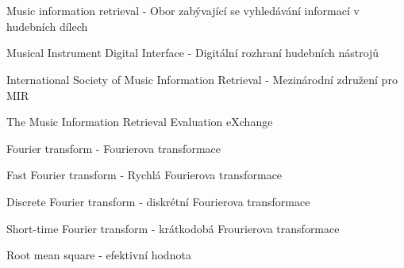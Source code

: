 \cleardoublepage
\chapter*{\listofabbrevname}
{}

\begin{acronym}[KolikMista]
		{Music information retrieval - Obor zabývající se vyhledávání informací v hudebních dílech}
	
		{Musical Instrument Digital Interface - Digitální rozhraní hudebních nástrojů}

		{International Society of Music Information Retrieval - Mezinárodní združení pro \acs*{MIR}}	

		{The Music Information Retrieval Evaluation eXchange}

		{Fourier transform - Fourierova transformace}
		
		{Fast Fourier transform - Rychlá Fourierova transformace}

		{Discrete Fourier transform - diskrétní Fourierova transformace}

		{Short-time Fourier transform - krátkodobá Frourierova transformace}
	
		{Root mean square - efektivní hodnota}
\end{acronym}
